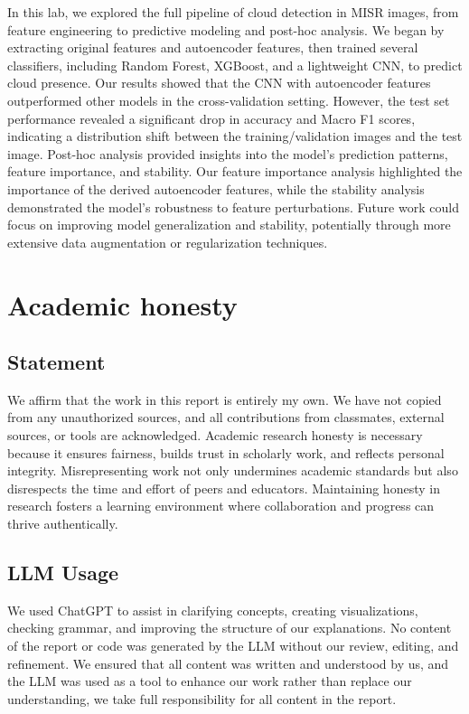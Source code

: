 \documentclass[10pt,letterpaper]{article}
\begin{document}
In this lab, we explored the full pipeline of cloud detection in MISR images, from feature engineering to predictive modeling and post-hoc analysis. We began by extracting original features and autoencoder features, then trained several classifiers, including Random Forest, XGBoost, and a lightweight CNN, to predict cloud presence. Our results showed that the CNN with autoencoder features outperformed other models in the cross-validation setting. However, the test set performance revealed a significant drop in accuracy and Macro F1 scores, indicating a distribution shift between the training/validation images and the test image. Post-hoc analysis provided insights into the model's prediction patterns, feature importance, and stability. Our feature importance analysis highlighted the importance of the derived autoencoder features, while the stability analysis demonstrated the model's robustness to feature perturbations. Future work could focus on improving model generalization and stability, potentially through more extensive data augmentation or regularization techniques.

\newpage

\printbibliography

\appendix
\section{Academic honesty}
\subsection{Statement}
We affirm that the work in this report is entirely my own. We have not copied from any unauthorized sources, and all contributions from classmates, external sources, or tools are acknowledged. Academic research honesty is necessary because it ensures fairness, builds trust in scholarly work, and reflects personal integrity. Misrepresenting work not only undermines academic standards but also disrespects the time and effort of peers and educators. Maintaining honesty in research fosters a learning environment where collaboration and progress can thrive authentically.

\subsection{LLM Usage}

We used ChatGPT to assist in clarifying concepts, creating visualizations, checking grammar, and improving the structure of our explanations. No content of the report or code was generated by the LLM without our review, editing, and refinement. We ensured that all content was written and understood by us, and the LLM was used as a tool to enhance our work rather than replace our understanding, we take full responsibility for all content in the report.
\end{document}
